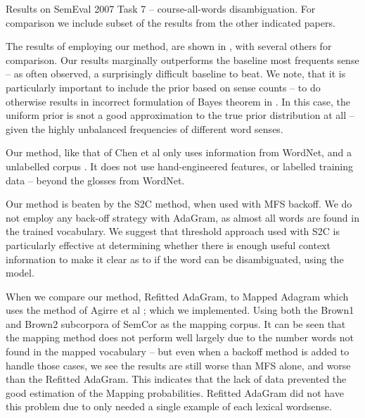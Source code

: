 \documentclass{sig-alternate}
\begin{document}
\begin{table*}
	\begin{adjustbox}{max width=\textwidth}
	\end{adjustbox}

	\caption{Results on SemEval 2007 Task 7 -- course-all-words disambiguation.
		For comparison we include subset of the results from the other indicated papers.
	} \label{samevalres}
\end{table*}

The results of employing our method, are shown in , with several others for comparison. Our results marginally outperforms the baseline most frequents sense -- as often observed, a surprisingly difficult baseline to beat.
We note, that it is particularly important to include the prior based on sense counts -- to do otherwise results in incorrect formulation of Bayes theorem in . In this case, the uniform prior is snot a good approximation to the true prior distribution at all -- given the highly unbalanced frequencies of different word senses. 

Our method, like that of Chen et al only uses information from WordNet, and a unlabelled corpus \parencite{Chen2014}. It does not use hand-engineered features, or labelled training data -- beyond the glosses from WordNet.

Our method is beaten by the S2C method, when used with MFS backoff.
We do not employ any back-off strategy with AdaGram, as almost all words are found in the trained vocabulary. We suggest that threshold approach used with S2C is particularly effective at determining whether there is enough useful context information to make it clear as to if the word can be disambiguated, using the model.


When we compare our method, Refitted AdaGram, to Mapped Adagram which uses the method of Agirre et al \parencite{agirre2006}; which we implemented. Using both the Brown1 and Brown2 subcorpora of SemCor as the mapping corpus.
It can be seen that the mapping method does not perform well largely due to the number words not found in the mapped vocabulary -- but even when a backoff method is added to handle those cases, we see the results are still worse than MFS alone, and worse than the Refitted AdaGram. This indicates that the lack of data prevented the good estimation of the Mapping probabilities. Refitted AdaGram did not have this problem due to only needed a single example of each lexical wordsense.
\end{document}
